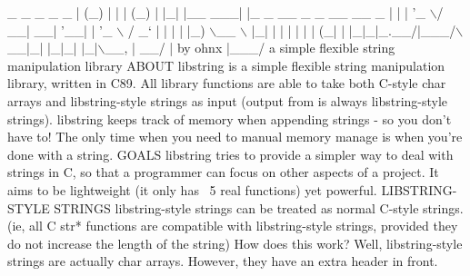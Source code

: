 
\begin{DoxyCode}
                 \_ \_ \_         \_        \_             
                | (\_) |       | |      (\_)            
                | |\_| |\_\_  \_\_\_| |\_ \_ \_\_ \_ \_ \_\_   \_\_ \_ 
                | | | \textcolor{stringliteral}{'\_ \(\backslash\)/ \_\_| \_\_| '}\_\_| | \textcolor{stringliteral}{'\_ \(\backslash\) / \_` |}
\textcolor{stringliteral}{                | | | |\_) \(\backslash\)\_\_ \(\backslash\) |\_| |  | | | | | (\_| |}
\textcolor{stringliteral}{                |\_|\_|\_.\_\_/|\_\_\_/\(\backslash\)\_\_|\_|  |\_|\_| |\_|\(\backslash\)\_\_, |}
\textcolor{stringliteral}{                                                 \_\_/ |}
\textcolor{stringliteral}{                           by ohnx              |\_\_\_/ }
\textcolor{stringliteral}{}
\textcolor{stringliteral}{            a simple flexible string manipulation library}
\textcolor{stringliteral}{}
\textcolor{stringliteral}{ABOUT}
\textcolor{stringliteral}{    libstring is a simple flexible string manipulation library,}
\textcolor{stringliteral}{    written in C89. All library functions are able to take both}
\textcolor{stringliteral}{    C-style char arrays and libstring-style strings as input}
\textcolor{stringliteral}{    (output from is always libstring-style strings).}
\textcolor{stringliteral}{}
\textcolor{stringliteral}{    libstring keeps track of memory when appending strings -}
\textcolor{stringliteral}{    so you don'}t have to! The only time when you need to manual
    memory manage is when you\textcolor{stringliteral}{'re done with a string.}
\textcolor{stringliteral}{}
\textcolor{stringliteral}{GOALS}
\textcolor{stringliteral}{    libstring tries to provide a simpler way to deal with strings}
\textcolor{stringliteral}{    in C, so that a programmer can focus on other aspects of a}
\textcolor{stringliteral}{    project. It aims to be lightweight (it only has ~5 real}
\textcolor{stringliteral}{    functions) yet powerful. }
\textcolor{stringliteral}{}
\textcolor{stringliteral}{LIBSTRING-STYLE STRINGS}
\textcolor{stringliteral}{    libstring-style strings can be treated as normal C-style}
\textcolor{stringliteral}{    strings. (ie, all C str* functions are compatible with}
\textcolor{stringliteral}{    libstring-style strings, provided they do not increase the}
\textcolor{stringliteral}{    length of the string)}
\textcolor{stringliteral}{}
\textcolor{stringliteral}{    How does this work? Well, libstring-style strings are actually}
\textcolor{stringliteral}{    char arrays. However, they have an extra header in front.}

\end{DoxyCode}
